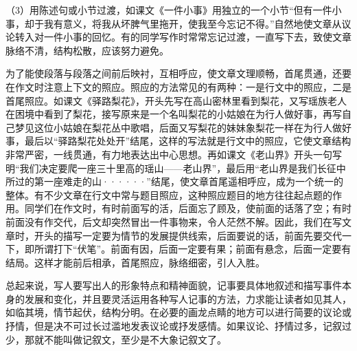 （3）用陈述句或小节过渡，如课文《一件小事》用独立的一个小节“但有一件小事，却于我有意义，将我从坏脾气里拖开，使我至今忘记不得。”自然地使文章从议论转入对一件小事的回忆。有的同学写作时常常忘记过渡，一直写下去，致使文章脉络不清，结构松散，应该努力避免。

为了能使段落与段落之间前后映衬，互相呼应，使文章文理顺畅，首尾贯通，还要在作文时注意上下文的照应。照应的方法常见的有两种：一是行文中的照应，二是首尾照应。如课文《驿路梨花》，开头先写在高山密林里看到梨花，又写瑶族老人在困境中看到了梨花，接写原来是一个名叫梨花的小姑娘在为行人做好事，再写自己梦见这位小姑娘在梨花丛中歌唱，后面又写梨花的妹妹象梨花一样在为行人做好事，最后以“驿路梨花处处开”结尾，这样的写法就是行文中的照应，它使文章结构非常严密，一线贯通，有力地表达出中心思想。再如课文《老山界》开头一句写明“我们决定要爬一座三十里高的瑶山——老山界”，最后用“老山界是我们长征中所过的第一座难走的山······”结尾，使文章首尾遥相呼应，成为一个统一的整体。有不少文章在行文中常与题目照应，这种照应题目的地方往往起点题的作用。同学们在作文时，有时前面写的活，后面忘了顾及，使前面的话落了空；有时前面没有作交代，后文却突然冒出一件事物来，令人茫然不解。因此，我们在写文章时，开头的描写一定要为情节的发展提供线索，后面要说的话，前面先要交代一下，即所谓打下“伏笔”。前面有因，后面一定要有果；前面有悬念，后面一定要有结局。这样才能前后相承，首尾照应，脉络细密，引人入胜。

总起来说，写人要写出人的形象特点和精神面貌，记事要具体地叙述和描写事件本身的发展和变化，并且要灵活运用各种写人记事的方法，力求能让读者如见其人，如临其境，情节起伏，结构分明。在必要的画龙点睛的地方可以进行简要的议论或抒情，但是决不可过长过滥地发表议论或抒发感情。如果议论、抒情过多，记叙过少，那就不能叫做记叙文，至少是不大象记叙文了。
\newpage